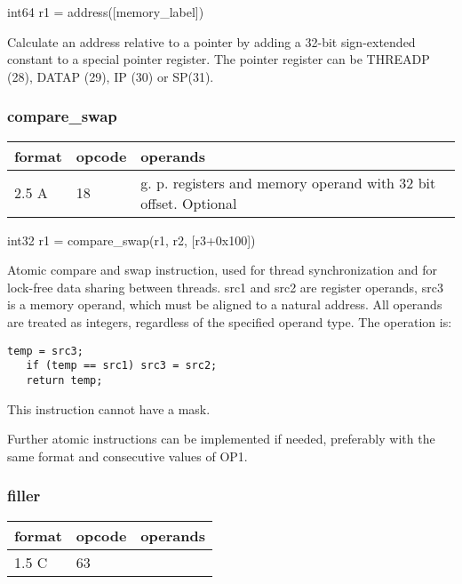 \documentclass[forwardcom.tex]{subfiles}
\begin{document}
int64 r1 = address([memory\_label])
\vspace{2mm}

Calculate an address relative to a pointer by adding a 32-bit sign-extended constant to a special pointer register. The pointer register can be THREADP (28), DATAP (29), IP (30) or SP(31).
\vspace{2mm}

\subsubsection{compare\_swap}
\label{table:compareSwapInstruction}
\begin{tabular}{|p{12mm}|p{12mm}|p{110mm}|}
\hline
\bfseries format & \bfseries opcode & \bfseries operands \\ \hline
2.5 A & 18 & g. p. registers and memory operand with 32 bit offset. Optional \\ \hline
\end{tabular}
\vspace{2mm}

int32 r1 = compare\_swap(r1, r2, [r3+0x100])
\vspace{2mm}

Atomic compare and swap instruction, used for thread synchronization and for lock-free data sharing between threads. src1 and src2 are register operands, src3 is a memory operand, which must be aligned to a natural address. All operands are treated as integers, regardless of the specified operand type. The operation is:

\begin{lstlisting}[frame=none]
   temp = src3;
   if (temp == src1) src3 = src2;
   return temp;
\end{lstlisting}

This instruction cannot have a mask.
\vspace{2mm}

Further atomic instructions can be implemented if needed, preferably with the same format and consecutive values of OP1.

\subsubsection{filler}
\label{table:fillerInstruction}
\begin{tabular}{|p{12mm}|p{12mm}|p{110mm}|}
\hline
\bfseries format & \bfseries opcode & \bfseries operands \\ \hline
1.5 C & 63 & \\ \hline
\end{tabular}
\vspace{2mm}
\end{document}
